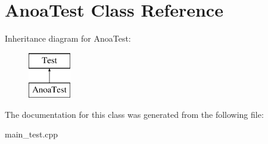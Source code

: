 \hypertarget{class_anoa_test}{}\section{Anoa\+Test Class Reference}
\label{class_anoa_test}
Inheritance diagram for Anoa\+Test\+:\begin{figure}[H]
\begin{center}
\leavevmode
\includegraphics[height=2.000000cm]{class_anoa_test}
\end{center}
\end{figure}


The documentation for this class was generated from the following file\+:\begin{DoxyCompactItemize}
\item 
main\+\_\+test.\+cpp\end{DoxyCompactItemize}

